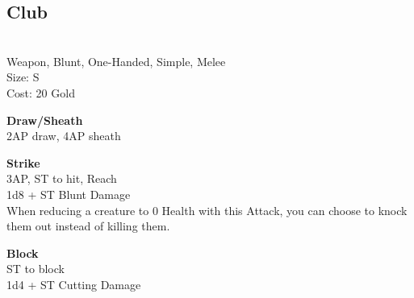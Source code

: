 \subsection{Club}\label{weapon:club}\\
Weapon, Blunt, One-Handed, Simple, Melee\\
Size: S\\
Cost: 20 Gold

\textbf{Draw/Sheath}\\
2AP draw, 4AP sheath

\textbf{Strike}\\
3AP, ST to hit,  Reach\\
1d8 + \texttimes ST Blunt Damage\\
When reducing a creature to 0 Health with this Attack, you can choose to knock them out instead of killing them.

\textbf{Block}\\
ST to block\\
1d4 + \texttimes ST Cutting Damage

